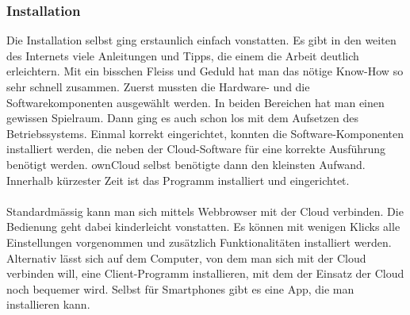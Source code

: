 \subsubsection{Installation}
Die Installation selbst ging erstaunlich einfach vonstatten. Es gibt in den weiten des Internets viele Anleitungen und Tipps, die einem die Arbeit deutlich erleichtern. Mit ein bisschen Fleiss und Geduld hat man das nötige Know-How so sehr schnell zusammen. Zuerst mussten die Hardware- und die Softwarekomponenten ausgewählt werden. In beiden Bereichen hat man einen gewissen Spielraum. Dann ging es auch schon los mit dem Aufsetzen des Betriebssystems. Einmal korrekt eingerichtet, konnten die Software-Komponenten installiert werden, die neben der Cloud-Software für eine korrekte Ausführung benötigt werden. ownCloud selbst benötigte dann den kleinsten Aufwand. Innerhalb kürzester Zeit ist das Programm installiert und eingerichtet.
\\
\\
Standardmässig kann man sich mittels Webbrowser mit der Cloud verbinden. Die Bedienung geht dabei kinderleicht vonstatten. Es können mit wenigen Klicks alle Einstellungen vorgenommen und zusätzlich Funktionalitäten installiert werden. Alternativ lässt sich auf dem Computer, von dem man sich mit der Cloud verbinden will, eine Client-Programm installieren, mit dem der Einsatz der Cloud noch bequemer wird. Selbst für Smartphones gibt es eine App, die man installieren kann.

